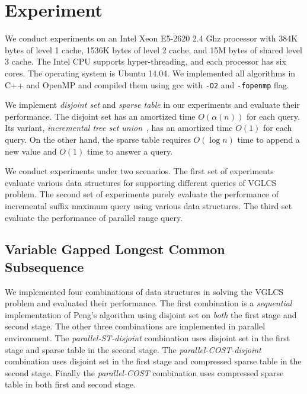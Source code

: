 \section{Experiment} \label{sec:Experiment}

We conduct experiments on an Intel Xeon E5-2620 2.4 Ghz processor with
384K bytes of level 1 cache, 1536K bytes of level 2 cache, and 15M
bytes of shared level 3 cache.  The Intel CPU supports
hyper-threading, and each processor has six cores.  The operating
system is Ubuntu 14.04.  We implemented all algorithms in C++ and
OpenMP and compiled them using gcc with {\tt -O2} and {\tt -fopenmp}
flag.

We implement {\em disjoint set} and {\em sparse table} in our
experiments and evaluate their performance.  The disjoint set has an
amortized time $O(\alpha(n))$ for each query.  Its variant, {\em
  incremental tree set union}~\cite{Gabow1983ALA}, has an amortized
time $O(1)$ for each query.  On the other hand, the sparse table
requires $O(\log n)$ time to append a new value and $O(1)$ time to
answer a query.

We conduct experiments under two scenarios.  The first set of
experiments evaluate various data structures for supporting different
queries of VGLCS problem.  The second set of experiments purely
evaluate the performance of incremental suffix maximum query using
various data structures.  The third set evaluate the performance of
parallel range query.


\subsection{Variable Gapped Longest Common Subsequence}

We implemented four combinations of data structures in solving the
VGLCS problem and evaluated their performance.  The first combination
is a {\em sequential} implementation of Peng's algorithm using
disjoint set on {\em both} the first stage and second stage.  The
other three combinations are implemented in parallel environment.  The
{\em parallel-ST-disjoint} combination uses disjoint set in the first
stage and sparse table in the second stage.  The {\em
  parallel-COST-disjoint} combination uses disjoint set in the first
stage and compressed sparse table in the second stage.  Finally the
{\em parallel-COST} combination uses compressed sparse table in both
first and second stage.

